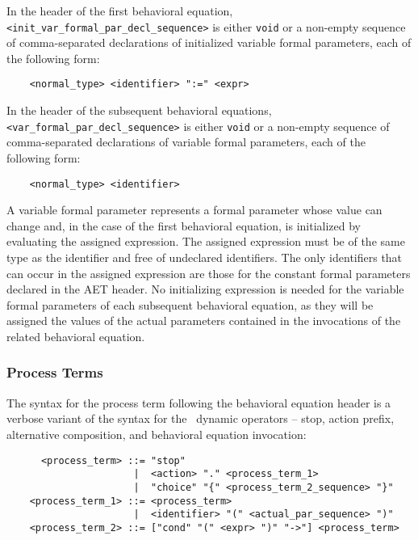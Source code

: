 In the header of the first behavioral equation, {\tt <init\_var\_formal\_par\_decl\_sequence>} is either
{\tt void} or a non-empty sequence of comma-separated declarations of initialized variable formal
parameters, each of the following form:

	\begin{verbatim}
    <normal_type> <identifier> ":=" <expr>
	\end{verbatim}

In the header of the subsequent behavioral equations, {\tt <var\_formal\_par\_decl\_sequence>} is either
{\tt void} or a non-empty sequence of comma-separated declarations of variable formal parameters, each of
the following form:

	\begin{verbatim}
    <normal_type> <identifier>
	\end{verbatim}

A variable formal parameter represents a formal parameter whose value can change and, in the case of the
first behavioral equation, is initialized by evaluating the assigned expression. The assigned expression
must be of the same type as the identifier and free of undeclared identifiers. The only identifiers that can
occur in the assigned expression are those for the constant formal parameters declared in the AET header. No
initializing expression is needed for the variable formal parameters of each subsequent behavioral equation,
as they will be assigned the values of the actual parameters contained in the invocations of the related
behavioral equation.


\subsubsection{Process Terms}

The syntax for the process term following the behavioral equation header is a verbose variant of the syntax
for the \empagr\ dynamic operators -- stop, action prefix, alternative composition, and behavioral equation
invocation:

	\begin{verbatim}
      <process_term> ::= "stop"
                      |  <action> "." <process_term_1>
                      |  "choice" "{" <process_term_2_sequence> "}"
    <process_term_1> ::= <process_term>
                      |  <identifier> "(" <actual_par_sequence> ")"
    <process_term_2> ::= ["cond" "(" <expr> ")" "->"] <process_term>
	\end{verbatim}

